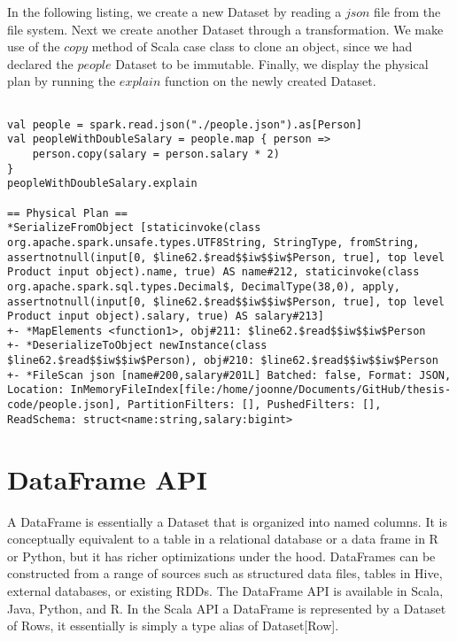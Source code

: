 \documentclass[main.tex]{thesis.tex}
\begin{document}
In the following listing, we create a new Dataset by reading a $json$ file from the file system. Next we create another Dataset through a transformation. We make use of the $copy$ method of Scala case class to clone an object, since we had declared the $people$ Dataset to be immutable. Finally, we display the physical plan by running the $explain$ function on the newly created Dataset.

\begin{lstlisting}[caption=Displaying the logical and physical plan of a Dataset]

val people = spark.read.json("./people.json").as[Person]
val peopleWithDoubleSalary = people.map { person => 
	person.copy(salary = person.salary * 2)
}
peopleWithDoubleSalary.explain

== Physical Plan ==
*SerializeFromObject [staticinvoke(class org.apache.spark.unsafe.types.UTF8String, StringType, fromString, assertnotnull(input[0, $line62.$read$$iw$$iw$Person, true], top level Product input object).name, true) AS name#212, staticinvoke(class org.apache.spark.sql.types.Decimal$, DecimalType(38,0), apply, assertnotnull(input[0, $line62.$read$$iw$$iw$Person, true], top level Product input object).salary, true) AS salary#213]
+- *MapElements <function1>, obj#211: $line62.$read$$iw$$iw$Person
+- *DeserializeToObject newInstance(class $line62.$read$$iw$$iw$Person), obj#210: $line62.$read$$iw$$iw$Person
+- *FileScan json [name#200,salary#201L] Batched: false, Format: JSON, Location: InMemoryFileIndex[file:/home/joonne/Documents/GitHub/thesis-code/people.json], PartitionFilters: [], PushedFilters: [], ReadSchema: struct<name:string,salary:bigint>

\end{lstlisting}

\section{DataFrame API}

A DataFrame is essentially a Dataset that is organized into named columns.
It is conceptually equivalent to a table in a relational database or a data frame in R or Python, but it has richer optimizations under the hood.
DataFrames can be constructed from a range of sources such as structured data files, tables in Hive, external databases, or existing RDDs.
The DataFrame API is available in Scala, Java, Python, and R.
In the Scala API a DataFrame is represented by a Dataset of Rows, it essentially is simply a type alias of Dataset[Row].
\cite{spark-sql-programming-guide}
\end{document}
